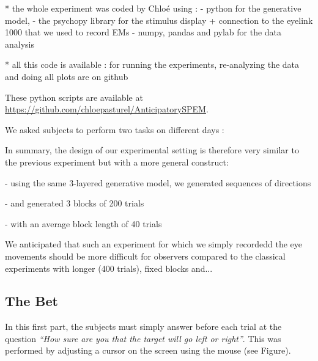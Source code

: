 \documentclass[profile,final,english,draft]{article}%
\begin{document}
 * the whole experiment was coded by Chloé using :
 - python for the generative model,
 - the psychopy library for the stimulus display + connection to the eyelink 1000 that we used to record EMs
 - numpy, pandas and pylab for the data analysis

  * all this code is available : for running the experiments, re-analyzing the data and doing all plots are on github

These python scripts are available at \url{https://github.com/chloepasturel/AnticipatorySPEM}.


We asked subjects to perform two tasks on different days :

In summary, the design of our experimental setting is therefore very similar to the previous experiment but with a more general construct:

- using the same 3-layered generative model, we generated sequences of directions

- and generated 3 blocks of 200 trials

- with an average block length of 40 trials

We anticipated that such an  experiment for which we simply recordedd the eye movements should be more difficult for observers compared to the classical experiments with longer (400 trials), fixed blocks and...

\subsection{The Bet}
In this first part, the subjects must simply answer before each trial at the question \textit{ ``How sure are you that the target will go left or right''}. This was performed by adjusting a cursor on the screen using the mouse (see Figure).

\end{document}
